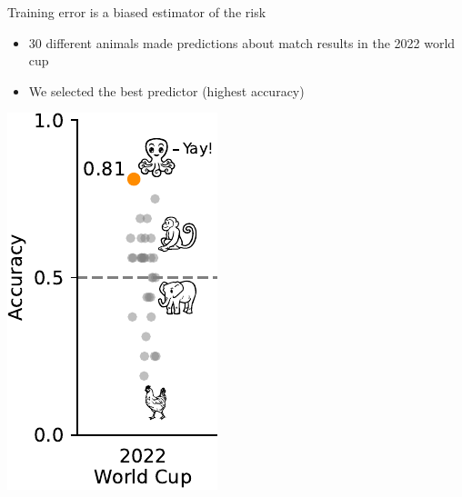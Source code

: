 \documentclass[presentation,mathserif,table]{beamer}
\begin{document}
\begin{frame}[label={sec:orgf0c76ac}]{Training error is a biased estimator of the risk}
\begin{itemize}
\item 30 different animals made predictions about match results in the 2022 world cup
\item We \alert{selected the best predictor} (highest accuracy)
\end{itemize}
\begin{center}
\includegraphics[height=.65 \textheight]{figures/generated/select_evaluate/select_evaluate_2.pdf}
\end{center}
\end{frame}
\end{document}
